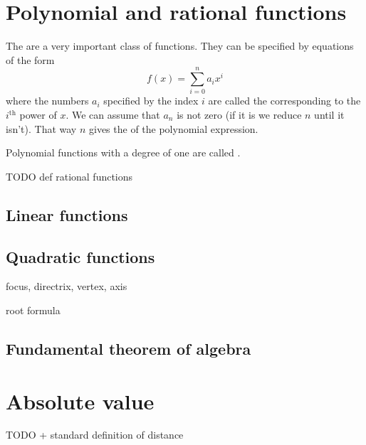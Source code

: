 \section{Polynomial and rational functions}
The  are a very important class of functions. They can be specified by equations of the form
\[ f(x) = \sum_{i=0}^n a_i x^i \]
where the numbers $a_i$ specified by the index $i$ are called the  corresponding to the $i^\text{th}$ power of $x$. We can assume that $a_n$ is not zero (if it is we reduce $n$ until it isn't). That way $n$ gives the  of the polynomial expression.

Polynomial functions with a degree of one are called .

TODO def rational functions

\subsection{Linear functions}
\subsection{Quadratic functions}
focus, directrix, vertex, axis

root formula

\subsection{Fundamental theorem of algebra}

\section{Absolute value}
TODO + standard definition of distance